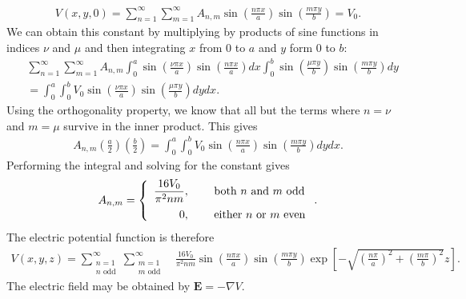 \begin{align}
  V(x,y,0) = \sum_{n=1}^\infty \sum_{m=1}^\infty A_{n,m} \sin \left( \frac{ n \pi x }{ a } \right)  \sin \left( \frac{ m \pi y }{ b } \right) = V_0 . 
\end{align}
We can obtain this constant by multiplying by products of sine functions in indices $\nu$ and $\mu$ and then integrating $x$ from 0 to $a$ and $y$ form 0 to $b$:
\begin{align}
  &\sum_{n=1}^\infty \sum_{m=1}^\infty A_{n,m} \int_0^a \sin \left( \frac{ \nu \pi x }{ a } \right) \sin \left( \frac{ n \pi x }{ a } \right) dx \int_0^b  \sin \left( \frac{ \mu \pi y  }{ b } \right) \sin \left( \frac{ m \pi y }{ b } \right) dy \nonumber \\
  &= \int_0^a \int_0^b V_0 \sin \left( \frac{ \nu \pi x }{ a } \right)  \sin \left( \frac{ \mu \pi y  }{ b } \right) dy dx .
\end{align}
Using the orthogonality property, we know that all but the terms where $n = \nu$ and $m = \mu$ survive in the inner product. This gives
\begin{align}
  A_{n,m} \left( \frac{a}{2} \right) \left( \frac{b}{2} \right) = \int_0^a \int_0^b V_0 \sin \left( \frac{ n \pi x }{ a } \right)  \sin \left( \frac{ m \pi y  }{ b } \right) dy dx .
\end{align}
Performing the integral and solving for the constant gives
\begin{align}
  A_{n,m} = \left\{ \begin{array}{r l}
  \dfrac{16 V_0}{\pi^2 n m }, & \quad \text{ both $n$ and $m$ odd} \vspace{0.2cm} \\
  0, & \quad \text{ either $n$ or $m$ even} \\ \end{array} \right. .
\end{align}
The electric potential function is therefore
\begin{align}
  V(x,y,z) = \sum_{\substack{n=1 \\ n \text{ odd}}}^\infty \sum_{\substack{m=1 \\ m \text{ odd}}}^\infty  &\frac{16 V_0}{\pi^2 n m } \sin \left( \frac{ n \pi x }{ a } \right)  \sin \left( \frac{ m \pi y }{ b } \right)  \exp \left[ -\sqrt{ \left( \frac{ n \pi }{ a } \right)^2 + \left( \frac{ m \pi }{ b } \right)^2 }  z \right] . 
\end{align}
The electric field may be obtained by $\mathbf{E} = -\nabla V$.



